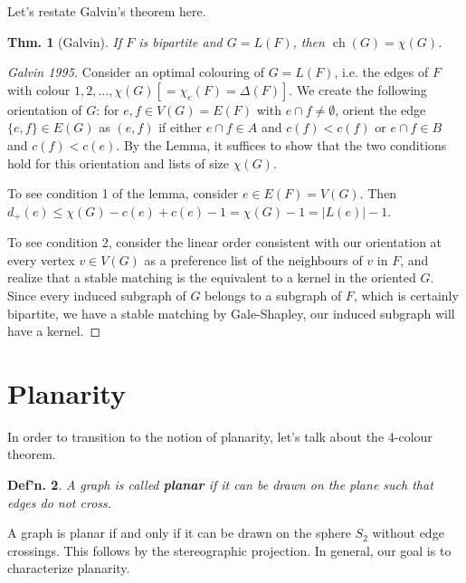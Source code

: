\documentclass[12pt, a4paper]{book}
\DeclareMathOperator{\ch}{ch}
\newtheorem{theorem}{Thm.}[section]
\newtheorem{definition}[theorem]{Def'n.}
\theoremstyle{nonumberplain}
\newtheorem{proof}{Proof}
\begin{document}
Let's restate Galvin's theorem here.
\begin{theorem}[Galvin]
    If $F$ is bipartite and $G=L(F)$, then $\ch(G)=\chi(G)$.
\end{theorem}
\begin{center}
\end{center}
\begin{proof}[Galvin 1995]
    Consider an optimal colouring of $G=L(F)$, i.e. the edges of $F$ with colour $1,2,\ldots,\chi(G)[=\chi_e(F)=\Delta(F)]$.
    We create the following orientation of $G$: for $e,f\in V(G)=E(F)$ with $e\cap f\neq\emptyset$, orient the edge $\{e,f\}\in E(G)$ as $(e,f)$ if either $e\cap f\in A$ and $c(f)<c(f)$ or $e\cap f\in B$ and $c(f)<c(e)$.
    By the Lemma, it suffices to show that the two conditions hold for this orientation and lists of size $\chi(G)$.

    To see condition 1 of the lemma, consider $e\in E(F)=V(G)$.
    Then $d_+(e)\leq\chi(G)-c(e)+c(e)-1=\chi(G)-1=|L(e)|-1$.

    To see condition 2, consider the linear order consistent with our orientation at every vertex $v\in V(G)$ as a preference list of the neighbours of $v$ in $F$, and realize that a stable matching is the equivalent to a kernel in the oriented $G$.
    Since every induced subgraph of $G$ belongs to a subgraph of $F$, which is certainly bipartite, we have a stable matching by Gale-Shapley, our induced subgraph will have a kernel.
\end{proof}
\section{Planarity}
In order to transition to the notion of planarity, let's talk about the 4-colour theorem.
\begin{definition}
    A graph is called \textbf{planar} if it can be drawn on the plane such that edges do not cross.
\end{definition}
A graph is planar if and only if it can be drawn on the sphere $S_2$ without edge crossings.
This follows by the stereographic projection.
In general, our goal is to characterize planarity.
\end{document}
